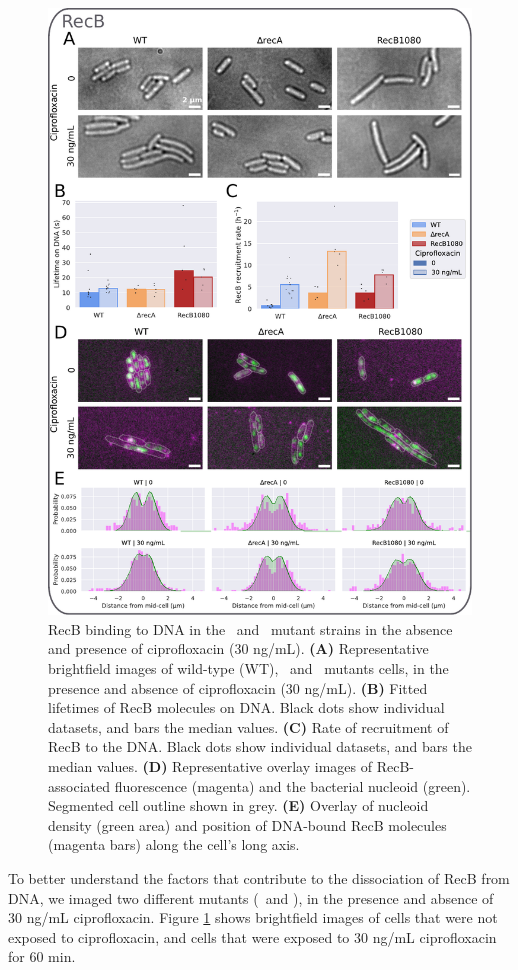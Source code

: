 \begin{figure}[htbp]
    \centering
    \includegraphics[width=.75\textwidth]{Figures/Fig4_mutants.pdf}
    \caption{RecB binding to DNA in the \dreca\ and \teneighty\ mutant strains in the absence and presence of ciprofloxacin (30 ng/mL). \textbf{(A)} Representative brightfield images of wild-type (WT), \dreca\ and \teneighty\ mutants cells, in the presence and absence of ciprofloxacin (30 ng/mL). \textbf{(B)} Fitted lifetimes of RecB molecules on DNA. Black dots show individual datasets, and bars the median values. \textbf{(C)} Rate of recruitment of RecB to the DNA. Black dots show individual datasets, and bars the median values. \textbf{(D)} Representative overlay images of RecB-associated fluorescence (magenta) and the bacterial nucleoid (green). Segmented cell outline shown in grey. \textbf{(E)} Overlay of nucleoid density (green area) and position of DNA-bound RecB molecules (magenta bars) along the cell's long axis.}
    \label{Fig:mutants}
\end{figure}

To better understand the factors that contribute to the dissociation of RecB from DNA, we imaged two different mutants (\dreca\ and \teneighty), in the presence and absence of 30 ng/mL ciprofloxacin. Figure \ref{Fig:mutants} shows brightfield images of cells that were not exposed to ciprofloxacin, and cells that were exposed to 30 ng/mL ciprofloxacin for 60 min.

